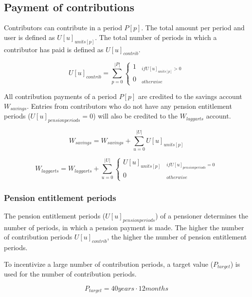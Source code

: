 \subsection{Payment of contributions}

Contributors can contribute in a period $P[p]$. The total amount per period and user is defined as $U[u]_{units[p]}$. The total number of periods in which a contributor has paid is defined as $U[u]_{contrib}$.

\begin{equation}
U[u]_{contrib} = \sum_{p=0}^{|P|} \begin{cases} 
1 & _{if U[u]_{units[p]} > 0} \\
0 & _{otherwise}
\end{cases}
\end{equation}


All contribution payments of a period $P[p]$ are credited to the savings account $W_{savings}$.
Entries from contributors who do not have any pension entitlement periods ($U[u]_{pensionperiods} = 0$) will also be credited to the $W_{laggarts}$ account.


\begin{equation}
W_{savings} = W_{savings} + \sum_{u=0}^{|U|} U[u]_{units[p]}
\end{equation}


\begin{dmath}
W_{laggarts} = W_{laggarts} + \sum_{u=0}^{|U|} \begin{cases} 
U[u]_{units[p]} & _{if U[u]_{pensionperiods} = 0} \\
0 & _{otherwise}
\end{cases}
\end{dmath}

\subsubsection{Pension entitlement periods}
The pension entitlement periods ($U[u]_{pensionperiods}$) of a pensioner determines the number of periods,
in which a pension payment is made. The higher the number of contribution periods
$U[u]_{contrib}$, the higher the number of pension entitlement periods.

To incentivize a large number of contribution periods, a target value ($P_{target}$) is used
for the number of contribution periods. 

\begin{equation}
	P_{target} = 40 years \cdot 12 months
\end{equation}

